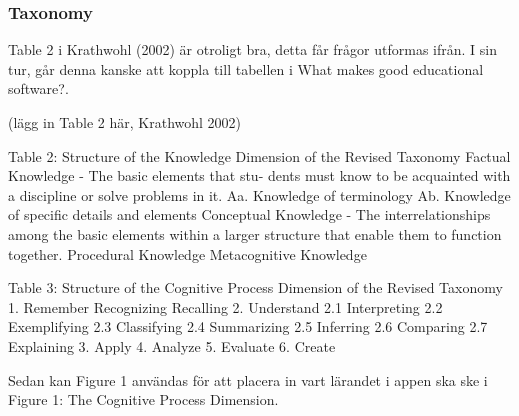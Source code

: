 \subsubsection{Taxonomy}

Table 2 i Krathwohl (2002) är otroligt bra, detta får frågor utformas ifrån. I sin tur, går denna kanske att koppla till tabellen i What makes good educational software?.

(lägg in Table 2 här, Krathwohl 2002)

Table 2: Structure of the Knowledge Dimension of the Revised Taxonomy
Factual Knowledge - The basic elements that stu- dents must know to be acquainted with a discipline or solve problems in it.
  Aa. Knowledge of terminology
  Ab. Knowledge of specific details and elements
Conceptual Knowledge - The interrelationships among the basic elements within a larger structure that enable them to function together.
Procedural Knowledge
Metacognitive Knowledge

Table 3: Structure of the Cognitive Process Dimension of the Revised Taxonomy
1. Remember
  Recognizing
  Recalling
2. Understand
  2.1 Interpreting
  2.2 Exemplifying
  2.3 Classifying
  2.4 Summarizing
  2.5 Inferring
  2.6 Comparing
  2.7 Explaining
3. Apply
4. Analyze
5. Evaluate
6. Create

Sedan kan Figure 1 användas för att placera in vart lärandet i appen ska ske i Figure 1: The Cognitive Process Dimension.